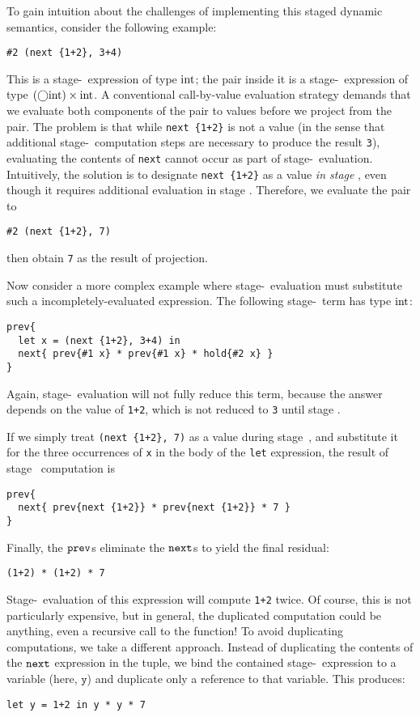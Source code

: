 To gain intuition about the challenges of implementing this staged dynamic
semantics, consider the following example:
\begin{lstlisting}
#2 (next {1+2}, 3+4)
\end{lstlisting}
This is a stage-\bbone\ expression of type ${\rm int}$; the pair inside it is a
stage-\bbone\ expression of type $(\bigcirc{\rm int})\times{\rm int}$. A conventional
call-by-value evaluation strategy demands that we evaluate both components of
the pair to values before we project from the pair. The problem is that
while \verb|next {1+2}| is not a value (in the sense that additional
stage-\bbtwo\ computation steps are necessary to produce the result \verb|3|), evaluating the contents of \verb|next| cannot occur as part of stage-\bbone\ evaluation.
Intuitively, the solution is to designate \verb|next {1+2}| as a value \emph{in
stage \bbone}, even though it requires additional evaluation in stage \bbtwo.
Therefore, we evaluate the pair to
\begin{lstlisting}
#2 (next {1+2}, 7)
\end{lstlisting}
then obtain \verb|7| as the result of projection.

Now consider a more complex example where 
stage-\bbone\ evaluation must substitute such a incompletely-evaluated
expression. The following stage-\bbtwo\ term has type ${\rm int}$:
\begin{lstlisting} 
prev{
  let x = (next {1+2}, 3+4) in
  next{ prev{#1 x} * prev{#1 x} * hold{#2 x} }
}
\end{lstlisting}
Again, stage-\bbone\ evaluation will not fully reduce this term, because the answer
depends on the value of \verb|1+2|, which is not reduced to \verb|3| until
stage \bbtwo.

If we simply treat \verb|(next {1+2}, 7)| as a value during stage~\bbone, and
substitute it for the three occurrences of \verb|x| in the body of the
\verb|let| expression, the result of stage \bbone\ computation is
\begin{lstlisting} 
prev{
  next{ prev{next {1+2}} * prev{next {1+2}} * 7 }
}
\end{lstlisting}
Finally, the ${\tt prev}$s eliminate the ${\tt next}$s to yield the final residual:
\begin{lstlisting} 
(1+2) * (1+2) * 7
\end{lstlisting}
Stage-\bbtwo\ evaluation of this expression will compute \verb|1+2| twice. Of
course, this is not particularly expensive, but in general, the duplicated
computation could be anything, even a recursive call to the function! To avoid duplicating
computations, we take a different approach.  Instead of
duplicating the contents of the ${\tt next}$ expression in the tuple, we bind the contained stage-\bbtwo\ expression to
a variable (here, $\mathtt{y}$) and duplicate only a reference to that variable.
This produces:
\begin{lstlisting} 
let y = 1+2 in y * y * 7
\end{lstlisting}

